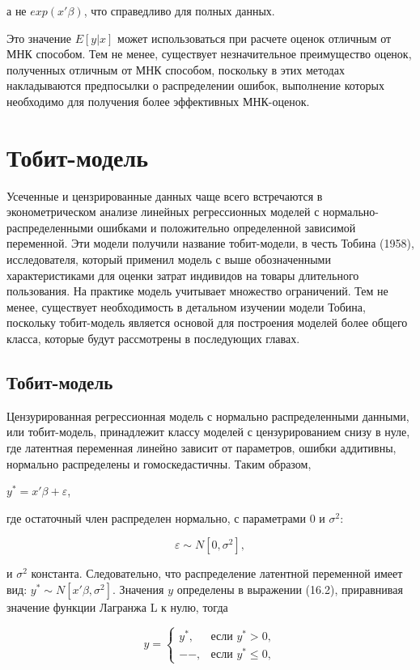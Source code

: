 а не $exp(x'\beta)$, что справедливо для полных данных.

Это значение $E[y|x]$ может использоваться при расчете оценок отличным от МНК способом. Тем не менее, существует незначительное преимущество оценок, полученных отличным от МНК способом, поскольку в этих методах накладываются предпосылки о распределении ошибок, выполнение которых необходимо для получения более эффективных МНК-оценок.

\section{Тобит-модель}

Усеченные и цензрированные данных чаще всего встречаются в эконометрическом анализе линейных регрессионных моделей с нормально-распределенными ошибками и положительно определенной зависимой переменной. Эти модели получили название тобит-модели, в честь Тобина (1958), исследователя, который применил модель с выше обозначенными характеристиками для оценки затрат индивидов на товары длительного пользования. На практике модель учитывает множество ограничений. Тем не менее, существует необходимость в детальном изучении модели Тобина, поскольку тобит-модель является основой для построения моделей более общего класса, которые будут рассмотрены в последующих главах.

\subsection{Тобит-модель}

Цензурированная регрессионная модель с нормально распределенными данными, или тобит-модель, принадлежит классу моделей с цензурированием снизу в нуле, где латентная переменная линейно зависит от параметров, ошибки аддитивны, нормально распределены и гомоскедастичны. Таким образом, 

$y^{*}=x'\beta+\varepsilon$,

где остаточный член распределен нормально, с параметрами $0$ и $\sigma^2$:

\[
\varepsilon{\sim}N[0,\sigma^2],
\]

и $\sigma^2$ константа. Следовательно, что распределение латентной переменной имеет вид: $y^{*}{\sim}N[x'\beta,\sigma^2]$. Значения $y$ определены в выражении (16.2), приравнивая значение функции Лагранжа L к нулю, тогда 

\begin{equation}
y=
\begin{cases}
y^{*}, &\text{если $y^{*}>0$}, \\
--, & \text{если $y^{*}{\leq}0$},
\end{cases}
\end{equation}

